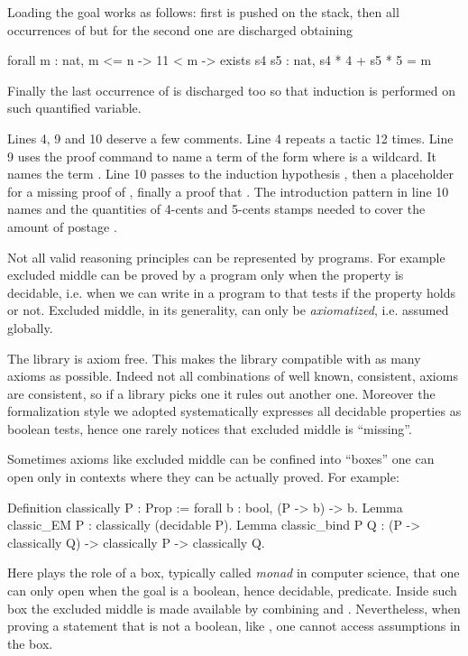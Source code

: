 Loading the goal works as follows: first  is pushed on
the stack, then all occurrences of  but for the second one are
discharged obtaining

\begin{coq}{}{}
forall m : nat,
  m <= n -> 11 < m -> exists s4 s5 : nat, s4 * 4 + s5 * 5 = m
\end{coq}
Finally the last occurrence of  is discharged too so that induction is performed
on such quantified variable.

Lines 4, 9 and 10 deserve a few comments.  Line 4 repeats a tactic
12 times.  Line 9 uses the  proof command to name  a
term of the form  where \C{_} is a wildcard. It names
 the term .  Line 10 passes to the induction
hypothesis , then a placeholder for a missing proof
of , finally a proof that .  The introduction
pattern in line 10 names  and  the quantities of
4-cents and 5-cents stamps needed to cover the amount of postage .


\label{sec:EM}

Not all valid reasoning principles can be represented by programs.
For example excluded middle can be proved by a program only when
the property is decidable, i.e. when we can write in \Coq{} a program
to  that tests if the property holds or not.
Excluded middle, in its generality, can only be \emph{axiomatized},
i.e. assumed globally.

The \mcbMC{} library is axiom free.  This makes the library compatible
with as many axioms as possible.  Indeed not all combinations of well
known, consistent, axioms are consistent, so if a library picks
one it rules out another one.  Moreover the formalization style
we adopted systematically expresses all decidable properties
as boolean tests, hence one rarely notices that excluded middle
is ``missing''.

Sometimes axioms like excluded middle can be confined into ``boxes''
one can open only in contexts where they can be actually proved.
For example:

\begin{coq}{}{}
Definition classically P : Prop := forall b : bool, (P -> b) -> b.
Lemma classic_EM P : classically (decidable P).
Lemma classic_bind P Q :
  (P -> classically Q) -> classically P -> classically Q.
\end{coq}
Here  plays the role of a box, typically called \emph{monad}
in computer science, that one can only open when the goal is a boolean,
hence decidable, predicate.  Inside such box the excluded middle is
made available by combining  and .
Nevertheless, when proving a statement that is not a boolean, like
, one cannot access assumptions in the  box.

